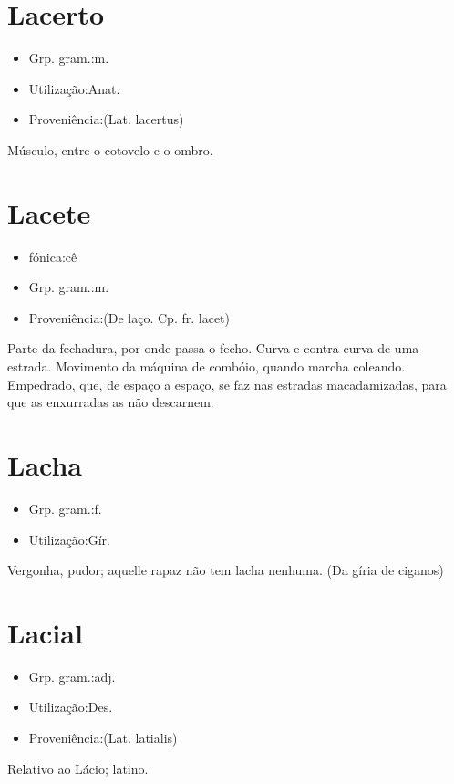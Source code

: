 \section{Lacerto}
\begin{itemize}
\item {Grp. gram.:m.}
\end{itemize}
\begin{itemize}
\item {Utilização:Anat.}
\end{itemize}
\begin{itemize}
\item {Proveniência:(Lat. \textunderscore lacertus\textunderscore )}
\end{itemize}
Músculo, entre o cotovelo e o ombro.
\section{Lacete}
\begin{itemize}
\item {fónica:cê}
\end{itemize}
\begin{itemize}
\item {Grp. gram.:m.}
\end{itemize}
\begin{itemize}
\item {Proveniência:(De \textunderscore laço\textunderscore . Cp. fr. \textunderscore lacet\textunderscore )}
\end{itemize}
Parte da fechadura, por onde passa o fecho.
Curva e contra-curva de uma estrada.
Movimento da máquina de combóio, quando marcha coleando.
Empedrado, que, de espaço a espaço, se faz nas estradas macadamizadas, para que as enxurradas as não descarnem.
\section{Lacha}
\begin{itemize}
\item {Grp. gram.:f.}
\end{itemize}
\begin{itemize}
\item {Utilização:Gír.}
\end{itemize}
Vergonha, pudor; \textunderscore aquelle rapaz não tem lacha nenhuma\textunderscore .
(Da gíria de ciganos)
\section{Lacial}
\begin{itemize}
\item {Grp. gram.:adj.}
\end{itemize}
\begin{itemize}
\item {Utilização:Des.}
\end{itemize}
\begin{itemize}
\item {Proveniência:(Lat. \textunderscore latialis\textunderscore )}
\end{itemize}
Relativo ao Lácio; latino.
